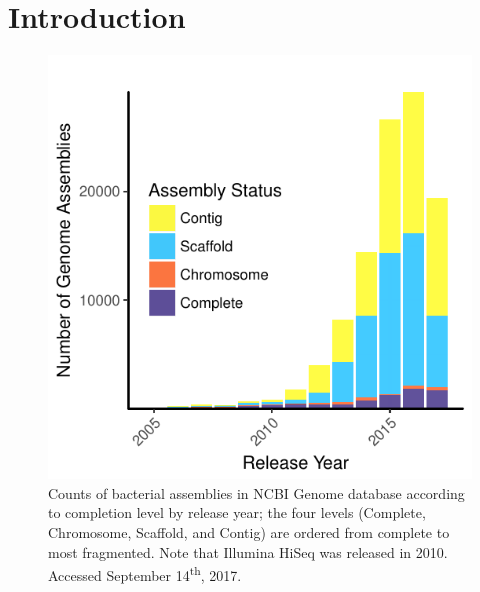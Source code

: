 \documentclass[a4,center,fleqn]{NAR}
\begin{document}
\section{Introduction}
\begin{figure}[!th]
  \centering
  \begin{center}
  \includegraphics[width=.85\columnwidth]{2017-09-14_plot1}
  \end{center}
  \caption{Counts of bacterial assemblies in NCBI Genome database according to completion level by release year; the four levels (Complete, Chromosome, Scaffold, and Contig) are ordered from complete to most fragmented.  Note that Illumina HiSeq was released in 2010.  Accessed September 14\textsuperscript{th}, 2017.}
  \label{fig:completions}
\end{figure}
\end{document}
